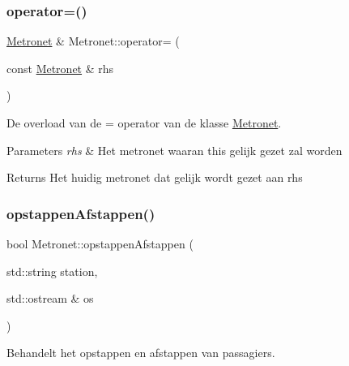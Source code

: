 \subsubsection{\texorpdfstring{operator=()}{operator=()}}
{\footnotesize\ttfamily \hyperlink{class_metronet}{Metronet} \& Metronet\+::operator= (\begin{DoxyParamCaption}\item[{const \hyperlink{class_metronet}{Metronet} \&}]{rhs }\end{DoxyParamCaption})}



De overload van de = operator van de klasse \hyperlink{class_metronet}{Metronet}. 


\begin{DoxyParams}{Parameters}
{\em rhs} & Het metronet waaran this gelijk gezet zal worden \\
\hline
\end{DoxyParams}
\begin{DoxyReturn}{Returns}
Het huidig metronet dat gelijk wordt gezet aan rhs 
\end{DoxyReturn}
\mbox{\label{class_metronet_a78c0cd9912306a5f7438ea43f5088e0a}} 
\subsubsection{\texorpdfstring{opstappen\+Afstappen()}{opstappenAfstappen()}}
{\footnotesize\ttfamily bool Metronet\+::opstappen\+Afstappen (\begin{DoxyParamCaption}\item[{std\+::string}]{station,  }\item[{std\+::ostream \&}]{os }\end{DoxyParamCaption})}



Behandelt het opstappen en afstappen van passagiers. 


